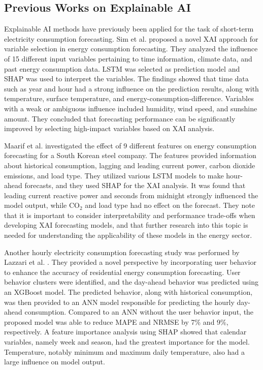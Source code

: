 
\subsection{Previous Works on Explainable AI}

Explainable AI methods have previously been applied for the task of short-term electricity consumption forecasting. Sim et al. \cite{sim_explainable_2022} proposed a novel XAI approach for variable selection in energy consumption forecasting. They analyzed the influence of 15 different input variables pertaining to time information, climate data, and past energy consumption data. LSTM was selected as prediction model and SHAP was used to interpret the variables. The findings showed that time data such as year and hour had a strong influence on the prediction results, along with temperature, surface temperature, and energy-consumption-difference. Variables with a weak or ambiguous influence included humidity, wind speed, and sunshine amount. They concluded that forecasting performance can be significantly improved by selecting high-impact variables based on XAI analysis.

Maarif et al. \cite{maarif_energy_2023} investigated the effect of 9 different features on energy consumption forecasting for a South Korean steel company. The features provided information about historical consumption, lagging and leading current power, carbon dioxide emissions, and load type. They utilized various LSTM models to make hour-ahead forecasts, and they used SHAP for the XAI analysis. It was found that leading current reactive power and seconds from midnight strongly influenced the model output, while CO$_2$ and load type had no effect on the forecast. They note that it is important to consider interpretability and performance trade-offs when developing XAI forecasting models, and that further research into this topic is needed for understanding the applicability of these models in the energy sector.


Another hourly electricity consumption forecasting study was performed by Lazzari et al. \cite{lazzari_user_2022}. They provided a novel perspective by incorporating user behavior to enhance the accuracy of residential energy consumption forecasting. User behavior clusters were identified, and the day-ahead behavior was predicted using an XGBoost model. The predicted behavior, along with historical consumption, was then provided to an ANN model responsible for predicting the hourly day-ahead consumption. Compared to an ANN without the user behavior input, the proposed model was able to reduce MAPE and NRMSE by 7\% and 9\%, respectively. A feature importance analysis using SHAP showed that calendar variables, namely week and season, had the greatest importance for the model. Temperature, notably minimum and maximum daily temperature, also had a large influence on model output.

